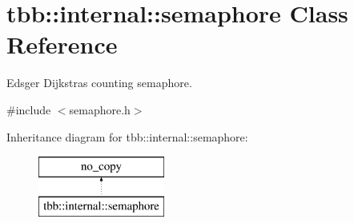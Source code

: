 \hypertarget{classtbb_1_1internal_1_1semaphore}{}\section{tbb\+:\+:internal\+:\+:semaphore Class Reference}
\label{classtbb_1_1internal_1_1semaphore}


Edsger Dijkstra\textquotesingle{}s counting semaphore.  




{\ttfamily \#include $<$semaphore.\+h$>$}

Inheritance diagram for tbb\+:\+:internal\+:\+:semaphore\+:\begin{figure}[H]
\begin{center}
\leavevmode
\includegraphics[height=2.000000cm]{classtbb_1_1internal_1_1semaphore}
\end{center}
\end{figure}
